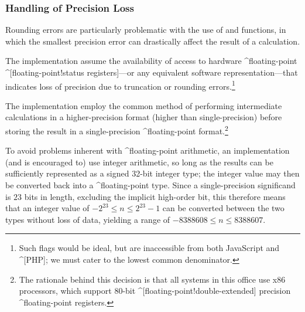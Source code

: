 \subsubsection{Handling of Precision Loss}
Rounding errors are particularly problematic with the use of  and
 functions, in which the smallest precision error can drastically
affect the result of a calculation.

The implementation \shallnot assume the availability of access to hardware
^floating-point ^[floating-point!status registers]---or any equivalent software
representation---that indicates loss of precision due to truncation or rounding
errors.\footnote{Such flags would be ideal, but are inaccessible from both
JavaScript and ^[PHP]; we must cater to the lowest common denominator.}

The implementation \may employ the common method of performing intermediate
calculations in a higher-precision format (higher than single-precision) before
storing the result in a single-precision ^floating-point format.\footnote{The
rationale behind this decision is that all systems in this office use x86
processors, which support 80-bit ^[floating-point!double-extended] precision
^floating-point registers.}

To avoid problems inherent with ^floating-point arithmetic, an implementation
\may (and is encouraged to) use integer arithmetic, so long as the results can
be sufficiently represented as a signed 32-bit integer type; the integer value
may then be converted back into a ^floating-point type. Since a single-precision
significand is $23$ bits in length, excluding the implicit high-order bit, this
therefore means that an integer value of $-2^{23} \leq n \leq 2^{23}-1$ can be
converted between the two types without loss of data, yielding a range of
$-8388608 \leq n \leq 8388607$.

